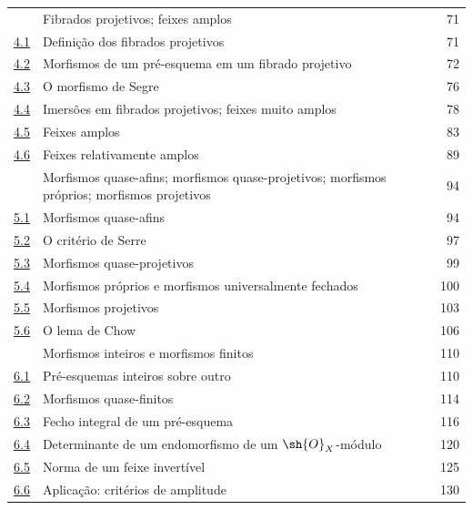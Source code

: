\documentclass[oneside,10pt]{amsart}
\begin{document}
\begin{longtable}{@{}p{}p{}r@{}}
\hyperref[section:II.4]{\textsection4} & Fibrados projetivos; feixes amplos & 71\\
\hyperref[subsection:II.4.1]{4.1} & Definição dos fibrados projetivos & 71\\
\hyperref[subsection:II.4.2]{4.2} & Morfismos de um pré-esquema em um fibrado projetivo & 72\\
\hyperref[subsection:II.4.3]{4.3} & O morfismo de Segre & 76\\
\hyperref[subsection:II.4.4]{4.4} & Imersões em fibrados projetivos; feixes muito amplos & 78\\
\hyperref[subsection:II.4.5]{4.5} & Feixes amplos & 83\\
\hyperref[subsection:II.4.6]{4.6} & Feixes relativamente amplos & 89\\
\hyperref[section:II.5]{\textsection5} & Morfismos quase-afins; morfismos quase-projetivos; morfismos próprios; morfismos projetivos & 94\\
\hyperref[subsection:II.5.1]{5.1} & Morfismos quase-afins & 94\\
\hyperref[subsection:II.5.2]{5.2} & O critério de Serre & 97\\
\hyperref[subsection:II.5.3]{5.3} & Morfismos quase-projetivos & 99\\
\hyperref[subsection:II.5.4]{5.4} & Morfismos próprios e morfismos universalmente fechados & 100\\
\hyperref[subsection:II.5.5]{5.5} & Morfismos projetivos & 103\\
\hyperref[subsection:II.5.6]{5.6} & O lema de Chow & 106\\
\hyperref[section:II.6]{\textsection6} & Morfismos inteiros e morfismos finitos & 110\\
\hyperref[subsection:II.6.1]{6.1} & Pré-esquemas inteiros sobre outro & 110\\
\hyperref[subsection:II.6.2]{6.2} & Morfismos quase-finitos & 114\\
\hyperref[subsection:II.6.3]{6.3} & Fecho integral de um pré-esquema & 116\\
\hyperref[subsection:II.6.4]{6.4} & Determinante de um endomorfismo de um $\sh{O}_X$-módulo & 120\\
\hyperref[subsection:II.6.5]{6.5} & Norma de um feixe invertível & 125\\
\hyperref[subsection:II.6.6]{6.6} & Aplicação: critérios de amplitude & 130\\

\end{longtable}
\end{document}

